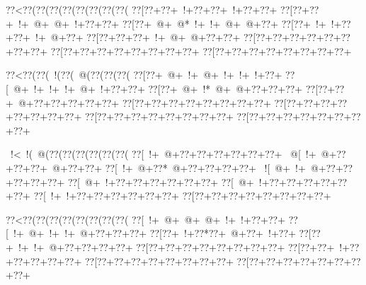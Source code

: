 \vbox{\vbox{\goo
\hbox{\0??<\0??(\0??(\0??(\0??(\0??(\0??(\0??(\0??(}
\hbox{\0??[\0??+\0??+\- !+\0??+\0??+\- !+\0??+\0??+}
\hbox{\0??[\0??+\0??+\- !+\- @+\- @+\- !+\0??+\0??+}
\hbox{\0??[\0??+\- @+\- @*\- !+\- !+\- @+\- @+\0??+}
\hbox{\0??[\0??+\- !+\- !+\0??+\0??+\- !+\- @+\0??+}
\hbox{\0??[\0??+\0??+\0??+\- !+\- @+\- @+\0??+\0??+}
\hbox{\0??[\0??+\0??+\0??+\0??+\0??+\0??+\0??+\0??+}
\hbox{\0??[\0??+\0??+\0??+\0??+\0??+\0??+\0??+\0??+}
\hbox{\0??[\0??+\0??+\0??+\0??+\0??+\0??+\0??+\0??+}
\smallskip
}
}
\hfil\break


\vbox{\vbox{\goo
\hbox{\0??<\0??(\0??(\- !(\0??(\- @(\0??(\0??(\0??(}
\hbox{\0??[\0??+\- @+\- !+\- @+\- !+\- !+\- !+\0??+}
\hbox{\0??[\- @+\- !+\- !+\- !+\- @+\- !+\0??+\0??+}
\hbox{\0??[\0??+\- @+\- !*\- @+\- @+\0??+\0??+\0??+}
\hbox{\0??[\0??+\0??+\- @+\0??+\0??+\0??+\0??+\0??+}
\hbox{\0??[\0??+\0??+\0??+\0??+\0??+\0??+\0??+\0??+}
\hbox{\0??[\0??+\0??+\0??+\0??+\0??+\0??+\0??+\0??+}
\hbox{\0??[\0??+\0??+\0??+\0??+\0??+\0??+\0??+\0??+}
\hbox{\0??[\0??+\0??+\0??+\0??+\0??+\0??+\0??+\0??+}
\smallskip
}
}
\hfil\break


\vbox{\vbox{\goo
\hbox{\- !<\- !(\- @(\0??(\0??(\0??(\0??(\0??(\0??(}
\hbox{\0??[\- !+\- @+\0??+\0??+\0??+\0??+\0??+\0??+}
\hbox{\- @[\- !+\- @+\0??+\0??+\0??+\- @+\0??+\0??+}
\hbox{\0??[\- !+\- @+\0??*\- @+\0??+\0??+\0??+\0??+}
\hbox{\- ![\- @+\- !+\- @+\0??+\0??+\0??+\0??+\0??+}
\hbox{\0??[\- @+\- !+\0??+\0??+\0??+\0??+\0??+\0??+}
\hbox{\0??[\- @+\- !+\0??+\0??+\0??+\0??+\0??+\0??+}
\hbox{\0??[\- !+\- !+\0??+\0??+\0??+\0??+\0??+\0??+}
\hbox{\0??[\0??+\0??+\0??+\0??+\0??+\0??+\0??+\0??+}
\smallskip
}
}
\hfil\break


\vbox{\vbox{\goo
\hbox{\0??<\0??(\0??(\0??(\0??(\0??(\0??(\0??(\0??(}
\hbox{\0??[\- !+\- @+\- @+\- @+\- !+\- !+\0??+\0??+}
\hbox{\0??[\- !+\- @+\- !+\- !+\- @+\0??+\0??+\0??+}
\hbox{\0??[\0??+\- !+\0??*\0??+\- @+\0??+\- !+\0??+}
\hbox{\0??[\0??+\- !+\- !+\- @+\0??+\0??+\0??+\0??+}
\hbox{\0??[\0??+\0??+\0??+\0??+\0??+\0??+\0??+\0??+}
\hbox{\0??[\0??+\0??+\- !+\0??+\0??+\0??+\0??+\0??+}
\hbox{\0??[\0??+\0??+\0??+\0??+\0??+\0??+\0??+\0??+}
\hbox{\0??[\0??+\0??+\0??+\0??+\0??+\0??+\0??+\0??+}
\smallskip
}
}
\hfil\break


